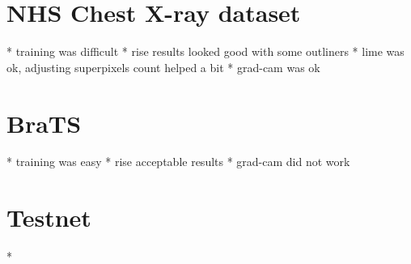 \section{NHS Chest X-ray dataset}
* training was difficult
* rise results looked good with some outliners
* lime was ok, adjusting superpixels count helped a bit 
* grad-cam was ok

\section{BraTS}
* training was easy
* rise acceptable results
* grad-cam did not work

\section{Testnet}
* 